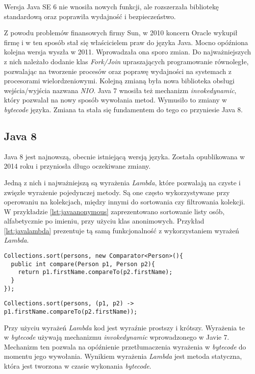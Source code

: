Wersja Java SE 6 nie wnosiła nowych funkcji, ale rozszerzała bibliotekę standardową oraz poprawiła wydajność i bezpieczeństwo.

Z powodu problemów finansowych firmy Sun, w 2010 koncern Oracle  wykupił firmę i w ten sposób stał się właścicielem praw do języka Java. Mocno opóźniona kolejna wersja wyszła w 2011. Wprowadzała ona sporo zmian. Do najważniejszych z nich należało dodanie klas \textsl{Fork/Join} upraszających programowanie równoległe, pozwalając na tworzenie procesów oraz poprawę wydajności na systemach z procesorami wielordzeniowymi. Kolejną zmianą była nowa biblioteka obsługi wejścia/wyjścia nazwana \textsl{NIO}. Java 7 wnosiła też mechanizm \textsl{invokedynamic}, który pozwalał na nowy sposób wywołania metod. Wymusiło to zmiany w \textsl{bytecode} języka. Zmiana ta stała się fundamentem do tego co przyniesie Java 8.

\subsection{Java 8}
Java 8 jest najnowszą, obecnie istniejącą wersją języka. Została opublikowana w 2014 roku i przyniosła długo oczekiwane zmiany.

Jedną z nich i najważniejszą są wyrażenia \textsl{Lambda}, które pozwalają na czyste i zwięzłe wyrażenie pojedynczej metody. Są one często wykorzystywane przy operowaniu na kolekcjach, między innymi do sortowania czy filtrowania kolekcji. W przykładzie \ref{lst:javaanonymous} zaprezentowano sortowanie listy osób, alfabetycznie po imieniu, przy użyciu klas anonimowych. Przykład \ref{lst:javalambda} prezentuje tą samą funkcjonalność z wykorzystaniem wyrażeń \textsl{Lambda}. 

\begin{lstlisting}[caption=Sortowanie kolekcji przy użyciu klas anonimowych, label={lst:javaanonymous}]
Collections.sort(persons, new Comparator<Person>(){
  public int compare(Person p1, Person p2){
    return p1.firstName.compareTo(p2.firstName);
  }
});
\end{lstlisting}

\begin{lstlisting}[caption=Sortowanie kolekcji przy użyciu wyrażeń \textsl{Lambda}, label={lst:javalambda}, aboveskip=0mm]
Collections.sort(persons, (p1, p2) -> p1.firstName.compareTo(p2.firstName));
\end{lstlisting}
 Przy użyciu wyrażeń \textsl{Lambda} kod jest wyraźnie prostszy i krótszy. Wyrażenia te w \textsl{bytecode} używają mechanizmu \textsl{invokedynamic} wprowadzonego w Javie 7. Mechanizm ten pozwala na opóźnienie przetłumaczenia wyrażenia w \textsl{bytecode} do momentu jego wywołania. Wynikiem wyrażenia \textsl{Lambda} jest metoda statyczna, która jest tworzona w czasie wykonania \textsl{bytecode}.

